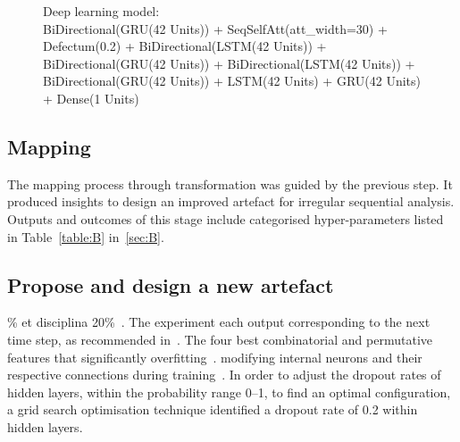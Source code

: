 \documentclass[preprint,3p,times,twocolumn]{elsarticle}  %
\begin{document}
\begin{figure}%
%
\centering
{}
%
\caption{\medskip Deep learning model:\\ \scriptsize
BiDirectional(GRU(42 Units)) + SeqSelfAtt(att\_width=30) +
Defectum(0.2) + BiDirec\-tion\-al(LSTM(42 Units)) +
Bi\-Direc\-tion\-al(GRU(42 Units)) + BiDirection\-al(LSTM(42 Units)) +
BiDirection\-al(GRU(42 Units)) + LSTM(42 Units) + GRU(42 Units) +
Dense(1 Units)
}\label{fig:4}
\end{figure}

\subsection{Mapping}
The mapping process through transformation was guided by the previous step. 
It produced insights to design an improved artefact for irregular sequential 
analysis.  Outputs and outcomes of this stage include categorised hyper-parameters 
listed in Table~\ref{table:B} in~\ref{sec:B}. 

\subsection{Propose and design a new artefact}
{}\% et disciplina 20\%~\citep{kamble19}.  The experiment 
each output corresponding to the next time step, as recommended in~\citep{azlan19}.
  The four best combinatorial and permutative features that significantly 
overfitting~\citep{hinton12}.
modifying internal neurons and their respective connections during 
training~\citep{srivastava14}.  In order to adjust the dropout rates of 
hidden layers, within the probability range 0--1, to find an optimal configuration,
a grid search optimisation technique identified a dropout rate of 0.2 within hidden 
layers. 
\end{document}
